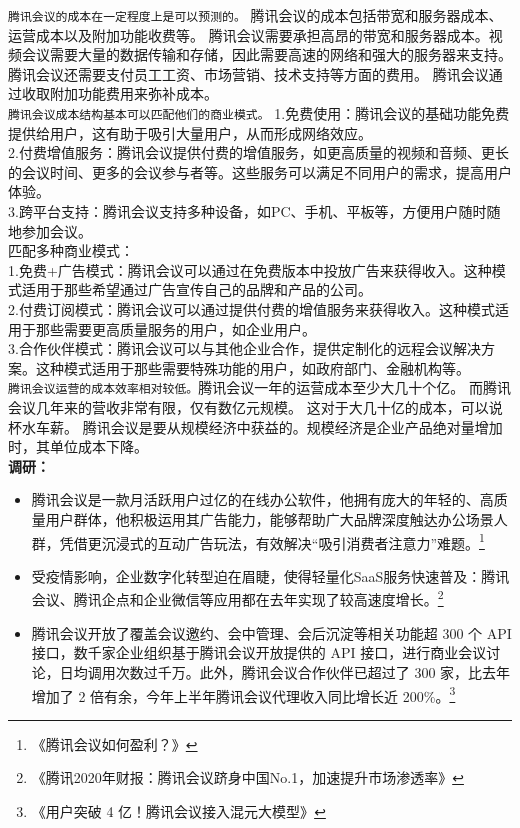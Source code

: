 \documentclass[a4paper,12pt]{article}
\begin{document}
\texttt{腾讯会议的成本在一定程度上是可以预测的。}
腾讯会议的成本包括带宽和服务器成本、运营成本以及附加功能收费等。
腾讯会议需要承担高昂的带宽和服务器成本。视频会议需要大量的数据传输和存储，因此需要高速的网络和强大的服务器来支持。
腾讯会议还需要支付员工工资、市场营销、技术支持等方面的费用。
腾讯会议通过收取附加功能费用来弥补成本。\\
\texttt{腾讯会议成本结构基本可以匹配他们的商业模式。}
1.免费使用：腾讯会议的基础功能免费提供给用户，这有助于吸引大量用户，从而形成网络效应。\\
2.付费增值服务：腾讯会议提供付费的增值服务，如更高质量的视频和音频、更长的会议时间、更多的会议参与者等。这些服务可以满足不同用户的需求，提高用户体验。\\
3.跨平台支持：腾讯会议支持多种设备，如PC、手机、平板等，方便用户随时随地参加会议。\\
匹配多种商业模式：\\
1.免费+广告模式：腾讯会议可以通过在免费版本中投放广告来获得收入。这种模式适用于那些希望通过广告宣传自己的品牌和产品的公司。\\
2.付费订阅模式：腾讯会议可以通过提供付费的增值服务来获得收入。这种模式适用于那些需要更高质量服务的用户，如企业用户。\\
3.合作伙伴模式：腾讯会议可以与其他企业合作，提供定制化的远程会议解决方案。这种模式适用于那些需要特殊功能的用户，如政府部门、金融机构等。\\

\texttt{腾讯会议运营的成本效率相对较低。}腾讯会议一年的运营成本至少大几十个亿。 而腾讯会议几年来的营收非常有限，仅有数亿元规模。 这对于大几十亿的成本，可以说杯水车薪。
腾讯会议是要从规模经济中获益的。规模经济是企业产品绝对量增加时，其单位成本下降。\\
\textbf{调研：}
\begin{itemize}
    \item 腾讯会议是一款月活跃用户过亿的在线办公软件，他拥有庞大的年轻的、高质量用户群体，他积极运用其广告能力，能够帮助广大品牌深度触达办公场景人群，凭借更沉浸式的互动广告玩法，有效解决“吸引消费者注意力”难题。\footnote{《腾讯会议如何盈利？》}
    \item 受疫情影响，企业数字化转型迫在眉睫，使得轻量化SaaS服务快速普及：腾讯会议、腾讯企点和企业微信等应用都在去年实现了较高速度增长。\footnote{《腾讯2020年财报：腾讯会议跻身中国No.1，加速提升市场渗透率》}
    \item 腾讯会议开放了覆盖会议邀约、会中管理、会后沉淀等相关功能超 300 个 API 接口，数千家企业组织基于腾讯会议开放提供的 API 接口，进行商业会议讨论，日均调用次数过千万。此外，腾讯会议合作伙伴已超过了 300 家，比去年增加了 2 倍有余，今年上半年腾讯会议代理收入同比增长近 200\%。\footnote{《用户突破 4 亿！腾讯会议接入混元大模型》}
\end{itemize}
\end{document}

